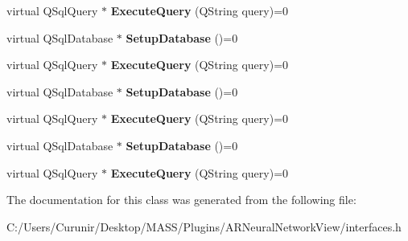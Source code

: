 \begin{DoxyCompactItemize}
virtual Q\+Sql\+Query $\ast$ {\bfseries Execute\+Query} (Q\+String query)=0
\item 
\mbox{\label{class_i_d_b_manager_plugin_add096dcc73790ff4230a44816090d989}} 
virtual Q\+Sql\+Database $\ast$ {\bfseries Setup\+Database} ()=0
\item 
\mbox{\label{class_i_d_b_manager_plugin_acc0927a1751a2f1d0d87b9b324db17e7}} 
virtual Q\+Sql\+Query $\ast$ {\bfseries Execute\+Query} (Q\+String query)=0
\item 
\mbox{\label{class_i_d_b_manager_plugin_add096dcc73790ff4230a44816090d989}} 
virtual Q\+Sql\+Database $\ast$ {\bfseries Setup\+Database} ()=0
\item 
\mbox{\label{class_i_d_b_manager_plugin_acc0927a1751a2f1d0d87b9b324db17e7}} 
virtual Q\+Sql\+Query $\ast$ {\bfseries Execute\+Query} (Q\+String query)=0
\item 
\mbox{\label{class_i_d_b_manager_plugin_add096dcc73790ff4230a44816090d989}} 
virtual Q\+Sql\+Database $\ast$ {\bfseries Setup\+Database} ()=0
\item 
\mbox{\label{class_i_d_b_manager_plugin_acc0927a1751a2f1d0d87b9b324db17e7}} 
virtual Q\+Sql\+Query $\ast$ {\bfseries Execute\+Query} (Q\+String query)=0
\end{DoxyCompactItemize}


The documentation for this class was generated from the following file\+:\begin{DoxyCompactItemize}
\item 
C\+:/\+Users/\+Curunir/\+Desktop/\+M\+A\+S\+S/\+Plugins/\+A\+R\+Neural\+Network\+View/interfaces.\+h\end{DoxyCompactItemize}
